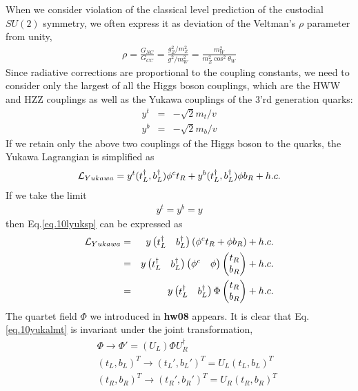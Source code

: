 \documentclass[12pt]{article}
\begin{document}
  When we consider violation of the classical level prediction of the
  custodial $SU(2)$ symmetry, we often express it as deviation of the
  Veltman's $\rho$ parameter from unity,
  \begin{eqnarray}
    \rho = \frac{G_{NC}}{G_{CC}}=\frac{ g_Z^2/m_Z^2}{g^2/m_W^2} = \frac{m_W^2}{m_Z^2 \cos^2\theta_W}
  \end{eqnarray}
  Since radiative corrections are proportional to the coupling constants,
  we need to consider only the largest of all the Higgs boson couplings,
  which are the HWW and HZZ couplings as well as the Yukawa couplings
  of the 3'rd generation quarks:
\begin{eqnarray}
  y^t &=& -\sqrt{2} m_t/v \\
  y^b &=& -\sqrt{2} m_b/v
\end{eqnarray}
  If we retain only the above two couplings of the Higgs boson to the
  quarks, the Yukawa Lagrangian is simplified as
\begin{eqnarray}
  {\cal L}_{Yukawa} =  y^t (t_L^\dagger,b_L^\dagger) \phi^c t_R
                + y^b (t_L^\dagger,b_L^\dagger) \phi   b_R
                + h.c. \label{eq.10lyuksp}
\end{eqnarray}
  If we take the limit
\begin{eqnarray}
  y^t = y^b = y \label{eq.10ylimt}
\end{eqnarray}
  then Eq.\ref{eq.10lyuksp} can be expressed as
\begin{eqnarray}
  {\cal L}_{Yukawa} &=& y
  \begin{pmatrix}
    t_L^\dagger & b_L^\dagger
  \end{pmatrix}
  (\phi^c t_R + \phi b_R) + h.c. \\
  &=& y 
  \begin{pmatrix}
    t_L^\dagger & b_L^\dagger
  \end{pmatrix}
  \begin{pmatrix}
    \phi^c & \phi
  \end{pmatrix}
  \begin{pmatrix}
    t_R \\ b_R
  \end{pmatrix}+h.c.\\
  &=& y 
  \begin{pmatrix}
    t_L^\dagger & b_L^\dagger
  \end{pmatrix}
  \Phi
  \begin{pmatrix}
    t_R \\ b_R
  \end{pmatrix} +h.c.\label{eq.10yukalmt}
\end{eqnarray}
  The quartet field $\Phi$ %
  we introduced in {\bf hw08} appears. It is clear
  that Eq.\ref{eq.10yukalmt} is invariant under the joint transformation,
\begin{eqnarray}
  &&\Phi \to \Phi' = (U_L) \Phi U_R^\dagger \label{eq.10jotran1}\\
  &&(t_L, b_L)^T \to (t_L', b_L')^T = U_L (t_L, b_L)^T  \label{eq.10jotran2} \\
  &&(t_R, b_R)^T \to  (t_R', b_R')^T = U_R (t_R, b_R)^T  \label{eq.10jotran3}
\end{eqnarray}
 
\end{document}
